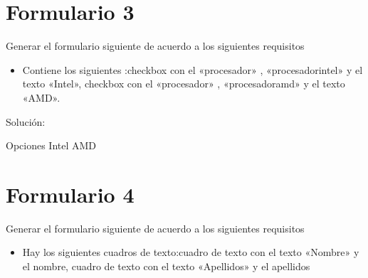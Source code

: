 \documentclass[letterpaper,10pt,spanish]{sphinxmanual}
\begin{document}
\section{Formulario 3}
\label{\detokenize{ejercicios/formularios/anexo_formularios:formulario-3}}
Generar el formulario siguiente de acuerdo a los siguientes requisitos
\begin{itemize}
\item {} 
Contiene los siguientes :checkbox con el   «procesador» ,   «procesadorintel»  y el texto «Intel», checkbox con el   «procesador» ,   «procesadoramd»  y el texto «AMD».

\end{itemize}


Solución:

\begin{sphinxVerbatim}[commandchars=\\\{\}]
  Opciones
      Intel   
      AMD   
\end{sphinxVerbatim}


\section{Formulario 4}
\label{\detokenize{ejercicios/formularios/anexo_formularios:formulario-4}}
Generar el formulario siguiente de acuerdo a los siguientes requisitos
\begin{itemize}
\item {} 
Hay los siguientes cuadros de texto:cuadro de texto con el texto «Nombre» y el  nombre, cuadro de texto con el texto «Apellidos» y el  apellidos

\end{itemize}
\end{document}
